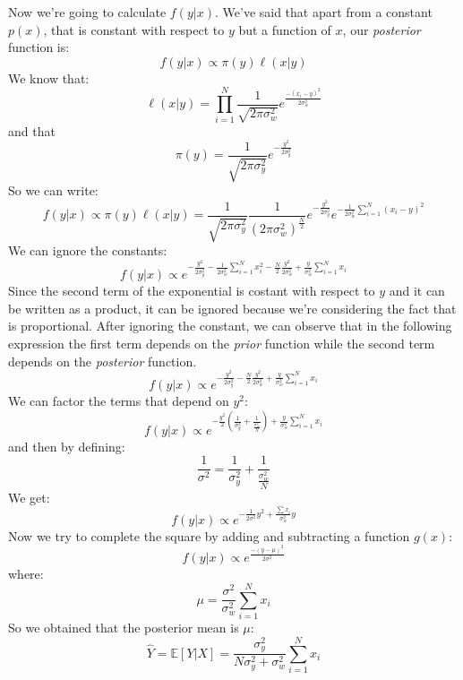 Now we're going to calculate $f(y|x)$. We've said that apart from a constant $p(x)$, that is constant with respect to $y$ but a function of $x$, our \textit{posterior} function is:
\[
    f(y|x) \propto \pi(y) \ell(x|y)
\]
We know that:
\[
    \ell(x|y) =  \prod_{i = 1}^{N} \frac{1}{\sqrt{2\pi \sigma^2_w}} e^{\frac{-(x_i-y)^2}{2\sigma_w^2}}
\]
and that
\[
    \pi(y) = \frac{1}{\sqrt{2\pi\sigma_y^2}} e^{-\frac{y^2}{2\sigma_y^2}}
\]
So we can write:
\[
    f(y|x) \propto \pi(y) \ell(x|y) = \frac{1}{\sqrt{2\pi\sigma_y^2}} \frac{1}{(2\pi\sigma_w^2)^{\frac{N}{2}}} e^{-\frac{y^2}{2\sigma_y^2}} e^{-\frac{1}{2\sigma_w^2} \sum_{i=1}^{N} (x_i-y)^2}
\]
We can ignore the constants:
\[
    f(y|x) \propto e^{-\frac{y^2}{2\sigma^2_y} - \frac{1}{2\sigma_w^2} \sum_{i=1}^{N} x_i^2 - \frac{N}{2} \frac{y^2}{2 \sigma_w^2} + \frac{y}{\sigma_w^2} \sum_{i=1}^{N} x_i}
\]
Since the second term of the exponential is costant with respect to $y$ and it can be written as a product, it can be ignored because we're considering the fact that is proportional. After ignoring the constant, we can observe that in the following expression the first term depends on the \textit{prior} function while the second term depends on the \textit{posterior} function.
\[
    f(y|x) \propto e^{-\frac{y^2}{2\sigma^2_y} - \frac{N}{2} \frac{y^2}{2 \sigma_w^2} + \frac{y}{\sigma_w^2} \sum_{i=1}^{N} x_i}
\]
We can factor the terms that depend on $y^2$:
\[
    f(y|x) \propto e^{-\frac{y^2}{2}\left(\frac{1}{\sigma_y^2} + \frac{1}{\frac{\sigma^2_w}{N}}\right) + \frac{y}{\sigma_w^2} \sum_{i=1}^{N} x_i}
\]
and then by defining:
\[
    \frac{1}{\sigma^2} = \frac{1}{\sigma_y^2} + \frac{1}{\frac{\sigma^2_w}{N}}
\]
We get:
\[
    f(y|x) \propto e^{-\frac{1}{2\sigma^2} y^2 + \frac{\sum x_i}{\sigma_w^2} y}
\]
Now we try to complete the square by adding and subtracting a function $g(x)$:
\[
    f(y|x) \propto e^{\frac{-(y-\mu)^2}{2\sigma^2}}
\]
where:
\[
    \mu = \frac{\sigma^2}{\sigma_w^2}\sum_{i=1}^{N} x_i
\]
So we obtained that the posterior mean is $\mu$:
\[
    \hat{Y} = \mathbb{E}\left[ Y | X\right] = \frac{\sigma_y^2}{N\sigma_y^2 + \sigma_w^2} \sum_{i=1}^{N} x_i
\]



